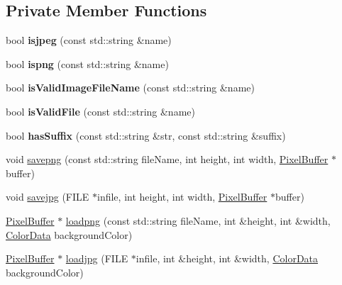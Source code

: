 \subsection*{Private Member Functions}
\begin{DoxyCompactItemize}
\item 
bool {\bfseries isjpeg} (const std\+::string \&name)\hypertarget{classImageHandler_acab3c475db0bafa4962e1c368c6c8dab}{}\label{classImageHandler_acab3c475db0bafa4962e1c368c6c8dab}

\item 
bool {\bfseries ispng} (const std\+::string \&name)\hypertarget{classImageHandler_a7b60eda1f737592ee903b184210b3b36}{}\label{classImageHandler_a7b60eda1f737592ee903b184210b3b36}

\item 
bool {\bfseries is\+Valid\+Image\+File\+Name} (const std\+::string \&name)\hypertarget{classImageHandler_a1e2f52b22c7db4f272e715ce41cfb50f}{}\label{classImageHandler_a1e2f52b22c7db4f272e715ce41cfb50f}

\item 
bool {\bfseries is\+Valid\+File} (const std\+::string \&name)\hypertarget{classImageHandler_a156a3bd0b6a5381a62863af5d21cf346}{}\label{classImageHandler_a156a3bd0b6a5381a62863af5d21cf346}

\item 
bool {\bfseries has\+Suffix} (const std\+::string \&str, const std\+::string \&suffix)\hypertarget{classImageHandler_a00a0f953ebe114ef1925ddafef149354}{}\label{classImageHandler_a00a0f953ebe114ef1925ddafef149354}

\item 
void \hyperlink{classImageHandler_afa5073aef96331be8b7c3e8fe8fbd373}{savepng} (const std\+::string file\+Name, int height, int width, \hyperlink{classPixelBuffer}{Pixel\+Buffer} $\ast$buffer)
\item 
void \hyperlink{classImageHandler_a93c1210df4b0b9d673e3ba99f1452d60}{savejpg} (F\+I\+LE $\ast$infile, int height, int width, \hyperlink{classPixelBuffer}{Pixel\+Buffer} $\ast$buffer)
\item 
\hyperlink{classPixelBuffer}{Pixel\+Buffer} $\ast$ \hyperlink{classImageHandler_a0812c8e895f28203138d8e67f3be2418}{loadpng} (const std\+::string file\+Name, int \&height, int \&width, \hyperlink{classColorData}{Color\+Data} background\+Color)
\item 
\hyperlink{classPixelBuffer}{Pixel\+Buffer} $\ast$ \hyperlink{classImageHandler_a84ff67cb9c77f69cf3a66bdcd4e3f977}{loadjpg} (F\+I\+LE $\ast$infile, int \&height, int \&width, \hyperlink{classColorData}{Color\+Data} background\+Color)
\end{DoxyCompactItemize}


